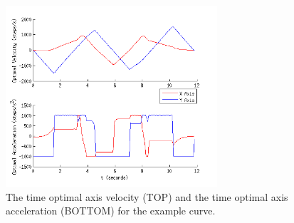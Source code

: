 \begin{figure}[htbp]
\centering
\includegraphics[width=0.7\textwidth]{figures/optimisation/bangbang_xy_ddt_dt.png}
\caption[$\dot{\textbf{q}}^*(t)$ and $\ddot{\textbf{q}}^*(t)$]{
The time optimal axis velocity (TOP) and the time optimal axis acceleration (BOTTOM) for the example curve.
\label{fig:bangbang}}
\end{figure}